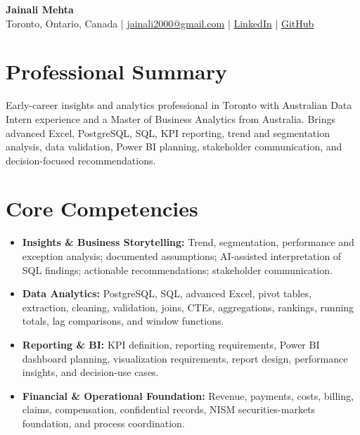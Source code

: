 \documentclass[letterpaper,10pt]{article}
\begin{document}
\begin{center}
  {\fontsize{17}{19}\selectfont\textbf{Jainali Mehta}}\\[2pt]
  \small Toronto, Ontario, Canada \;|\;
  \href{mailto:jainali2000@gmail.com}{jainali2000@gmail.com} \;|\;
  \href{https://www.linkedin.com/in/jainali-mehta}{LinkedIn} \;|\;
  \href{https://github.com/jainalimehta}{GitHub}
\end{center}
\vspace{-7pt}

\section{Professional Summary}
\small Early-career insights and analytics professional in Toronto with Australian Data Intern experience and a Master of Business Analytics from Australia. Brings advanced Excel, PostgreSQL, SQL, KPI reporting, trend and segmentation analysis, data validation, Power BI planning, stakeholder communication, and decision-focused recommendations.

\section{Core Competencies}
\begin{itemize}[leftmargin=0.16in,label=\textbullet,topsep=0pt,itemsep=1pt,parsep=0pt]
  \item \small \textbf{Insights \& Business Storytelling:} Trend, segmentation, performance and exception analysis; documented assumptions; AI-assisted interpretation of SQL findings; actionable recommendations; stakeholder communication.
  \item \small \textbf{Data Analytics:} PostgreSQL, SQL, advanced Excel, pivot tables, extraction, cleaning, validation, joins, CTEs, aggregations, rankings, running totals, lag comparisons, and window functions.
  \item \small \textbf{Reporting \& BI:} KPI definition, reporting requirements, Power BI dashboard planning, visualization requirements, report design, performance insights, and decision-use cases.
  \item \small \textbf{Financial \& Operational Foundation:} Revenue, payments, costs, billing, claims, compensation, confidential records, NISM securities-markets foundation, and process coordination.
\end{itemize}
\end{document}
